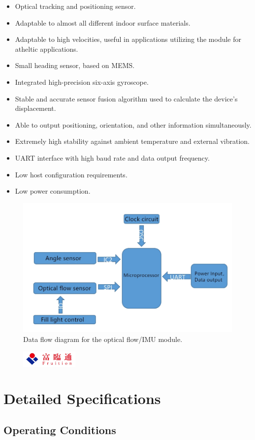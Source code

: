 \documentclass{scrreprt}
\newcommand{\pchapter}[1]{
	\begingroup\let\clearpage\relax
	\newpage
	\begin{figure}[H]
		\includegraphics[width=0.25\textwidth]{logo.jpeg}
	\end{figure}
	\chapter{#1}
	\endgroup
}
\begin{document}
\begin{CJK*}{UTF8}{gbsn}
\begin{itemize}
\item Optical tracking and positioning sensor.
\item Adaptable to almost all different indoor surface materials.
\item Adaptable to high velocities, useful in applications utilizing the module for atheltic applications.
\item Small heading sensor, based on MEMS.
\item Integrated high-precision six-axis gyroscope.
\item Stable and accurate sensor fusion algorithm used to calculate the device's displacement.
\item Able to output positioning, orientation, and other information simultaneously.
\item Extremely high stability against ambient temperature and external vibration.
\item UART interface with high baud rate and data output frequency.
\item Low host configuration requirements.
\item Low power consumption.
\end{itemize}

\begin{figure}[H]
\includegraphics[width = \textwidth]{diagram.png}
\caption{Data flow diagram for the optical flow/IMU module.}
\end{figure}

\pchapter{Detailed Specifications}

\section{Operating Conditions}


\end{CJK*}
\end{document}
